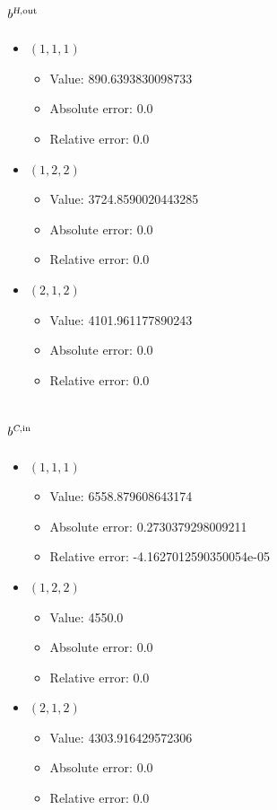 \documentclass{article}%
\begin{document}
\subsection{$b^{\textsl{H},\text{out}}$}%
\begin{itemize}%
	\item $(1, 1, 1)$%
	\begin{itemize}%
		\item Value: 890.6393830098733%
		\item Absolute error: 0.0%
		\item Relative error: 0.0%
	\end{itemize}%
	\item $(1, 2, 2)$%
	\begin{itemize}%
		\item Value: 3724.8590020443285%
		\item Absolute error: 0.0%
		\item Relative error: 0.0%
	\end{itemize}%
	\item $(2, 1, 2)$%
	\begin{itemize}%
		\item Value: 4101.961177890243%
		\item Absolute error: 0.0%
		\item Relative error: 0.0%
	\end{itemize}%
\end{itemize}%
\subsection{$b^{\textsl{C},\text{in}}$}%
\begin{itemize}%
	\item $(1, 1, 1)$%
	\begin{itemize}%
		\item Value: 6558.879608643174%
		\item Absolute error: 0.2730379298009211%
		\item Relative error: -4.1627012590350054e-05%
	\end{itemize}%
	\item $(1, 2, 2)$%
	\begin{itemize}%
		\item Value: 4550.0%
		\item Absolute error: 0.0%
		\item Relative error: 0.0%
	\end{itemize}%
	\item $(2, 1, 2)$%
	\begin{itemize}%
		\item Value: 4303.916429572306%
		\item Absolute error: 0.0%
		\item Relative error: 0.0%
	\end{itemize}%
\end{itemize}%
\end{document}
